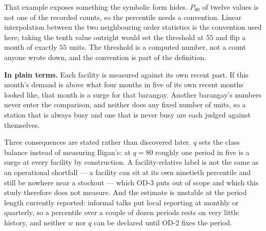 \noindent
That example exposes something the symbolic form hides. $P_{80}$ of twelve values is not one of the
recorded counts, so the percentile needs a convention. Linear interpolation between the two
neighbouring order statistics is the convention used here; taking the tenth value outright would
set the threshold at $55$ and flip a month of exactly $55$ units. The threshold is a computed
number, not a count anyone wrote down, and the convention is part of the definition.

\noindent\textbf{In plain terms.} Each facility is measured against its own recent past. If this
month's demand is above what four months in five of its own recent months looked like, that month is
a surge for that barangay. Another barangay's numbers never enter the comparison, and neither does
any fixed number of units, so a station that is always busy and one that is never busy are each
judged against themselves.

Three consequences are stated rather than discovered later. $q$ sets the class balance instead of
measuring Iligan's: at $q = 80$ roughly one period in five is a surge at every facility by
construction. A facility-relative label is not the same as an operational shortfall --- a facility
can sit at its own ninetieth percentile and still be nowhere near a stockout --- which OD-3 puts out
of scope and which this study therefore does not measure. And the estimate is unstable at the period
length currently reported: informal talks put local reporting at monthly or quarterly, so a
percentile over a couple of dozen periods rests on very little history, and neither $w$ nor $q$ can
be declared until OD-2 fixes the period.
